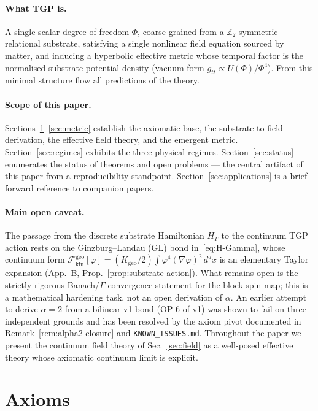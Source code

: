 \documentclass[11pt,a4paper]{article}
\renewcommand{\Phi}{\varPhi}
\newcommand{\Zp}{\mathbb{Z}_{2}}
\begin{document}
\paragraph{What TGP is.} A single scalar degree of freedom $\Phi$,
coarse-grained from a $\Zp$-symmetric relational substrate, satisfying a
single nonlinear field equation sourced by matter, and inducing a
hyperbolic effective metric whose temporal factor is the normalised
substrate-potential density (vacuum form
$g_{tt}\propto U(\Phi)/\Phi^{4}$). From this minimal structure flow all
predictions of the theory.

\paragraph{Scope of this paper.} Sections~\ref{sec:axioms}--\ref{sec:metric}
establish the axiomatic base, the substrate-to-field derivation, the
effective field theory, and the emergent metric. Section~\ref{sec:regimes}
exhibits the three physical regimes. Section~\ref{sec:status} enumerates the
status of theorems and open problems --- the central artifact of this paper
from a reproducibility standpoint. Section~\ref{sec:applications} is a brief
forward reference to companion papers.

\paragraph{Main open caveat.} The passage from the discrete substrate
Hamiltonian $H_{\Gamma}$ to the continuum TGP action rests on the
Ginzburg--Landau (GL) bond in~\eqref{eq:H-Gamma}, whose continuum form
$\mathcal{F}_{\mathrm{kin}}^{\mathrm{geo}}[\varphi]=(K_{\mathrm{geo}}/2)
\int\varphi^{4}(\nabla\varphi)^{2}\,d^{d}x$ is an elementary Taylor
expansion (App.~B, Prop.~\ref{prop:substrate-action}). What remains
open is the strictly rigorous Banach/$\Gamma$-convergence statement
for the block-spin map; this is a mathematical hardening task, not an
open derivation of $\alpha$. An earlier attempt to derive $\alpha=2$
from a bilinear v1 bond (OP-6 of v1) was shown to fail on three
independent grounds and has been resolved by the axiom pivot
documented in Remark~\ref{rem:alpha2-closure} and
\texttt{KNOWN\_ISSUES.md}. Throughout the paper we present the
continuum field theory of Sec.~\ref{sec:field} as a well-posed
effective theory whose axiomatic continuum limit is explicit.

\section{Axioms}\label{sec:axioms}
\end{document}
